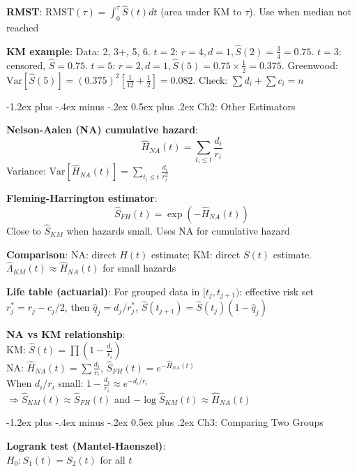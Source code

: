﻿\documentclass[10pt,letterpaper]{extarticle}
\makeatletter
\renewcommand{\section}{\@startsection{section}{1}{0mm}%
                                {-1.2ex plus -.4ex minus -.2ex}%
                                {0.5ex plus .2ex}%
                                {\normalfont\normalsize\bfseries}}
\newcommand{\h}[1]{\textbf{#1}}
\makeatother
\begin{document}
\begin{multicols}{3}
\h{RMST}: $\text{RMST}(\tau) = \int_0^\tau \hat{S}(t)dt$ (area under KM to $\tau$). Use when median not reached

\h{KM example}: Data: 2, 3+, 5, 6. $t=2$: $r=4, d=1, \hat{S}(2)=\frac{3}{4}=0.75$. $t=3$: censored, $\hat{S}=0.75$. $t=5$: $r=2, d=1, \hat{S}(5)=0.75 \times \frac{1}{2}=0.375$. Greenwood: $\text{Var}[\hat{S}(5)]=(0.375)^2[\frac{1}{12}+\frac{1}{2}]=0.082$. Check: $\sum d_i + \sum c_i = n$

\vspace{2pt}
\section{Ch2: Other Estimators}

\h{Nelson-Aalen (NA) cumulative hazard}: \\
$$\hat{H}_{NA}(t) = \sum_{t_i \le t} \frac{d_i}{r_i}$$
Variance: $\text{Var}[\hat{H}_{NA}(t)] = \sum_{t_i \le t} \frac{d_i}{r_i^2}$

\h{Fleming-Harrington estimator}: \\
$$\hat{S}_{FH}(t) = \exp(-\hat{H}_{NA}(t))$$
Close to $\hat{S}_{KM}$ when hazards small. Uses NA for cumulative hazard

\h{Comparison}: NA: direct $H(t)$ estimate; KM: direct $S(t)$ estimate. $\hat{\Lambda}_{KM}(t) \approx \hat{H}_{NA}(t)$ for small hazards

\h{Life table (actuarial)}: For grouped data in $[t_j, t_{j+1})$: effective risk set $r_j^* = r_j - c_j/2$, then $\hat{q}_j = d_j/r_j^*$, $\hat{S}(t_{j+1}) = \hat{S}(t_j)(1-\hat{q}_j)$

\h{NA vs KM relationship}: \\
KM: $\hat{S}(t) = \prod (1-\frac{d_i}{r_i})$ \\
NA: $\hat{H}_{NA}(t) = \sum \frac{d_i}{r_i}$, $\hat{S}_{FH}(t) = e^{-\hat{H}_{NA}(t)}$ \\
When $d_i/r_i$ small: $1-\frac{d_i}{r_i} \approx e^{-d_i/r_i}$ \\
$\Rightarrow \hat{S}_{KM}(t) \approx \hat{S}_{FH}(t)$ and $-\log\hat{S}_{KM}(t) \approx \hat{H}_{NA}(t)$

\vspace{2pt}
\section{Ch3: Comparing Two Groups}

\h{Logrank test (Mantel-Haenszel)}: \\
$H_0: S_1(t) = S_2(t)$ for all $t$


\end{multicols}
\end{document}
